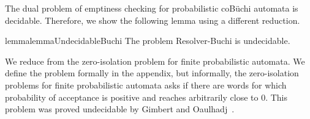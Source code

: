 The dual problem of emptiness checking for probabilistic coB\"uchi automata is decidable. Therefore, we show the following lemma using a different reduction.
\begin{restatable}{lemma}{lemmaUndecidableBuchi}\label{lemma:UndecidableBuchi}
    The problem \textsf{Resolver-Buchi} is undecidable.
\end{restatable}

We reduce from the zero-isolation problem for finite probabilistic automata. We define the problem formally in the appendix, but informally, the zero-isolation problems for finite probabilistic automata asks if there are words for which probability of acceptance is positive and reaches arbitrarily close to $0$. This problem was proved undecidable by Gimbert and Oaulhadj~\cite[Theorem 4]{GO10}. 


